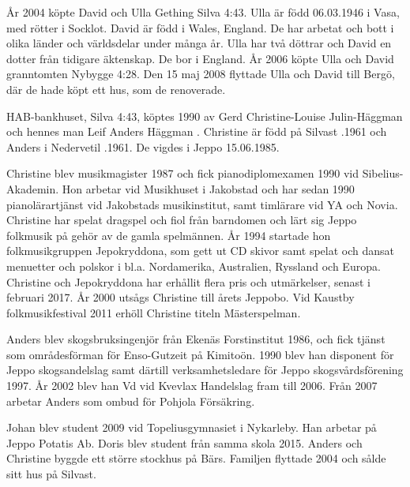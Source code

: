 År 2004 köpte David och Ulla Gething Silva 4:43. Ulla är född 06.03.1946 i Vasa, med rötter i Socklot. David är född i Wales, England. De har arbetat och bott i olika länder och världsdelar under många år. Ulla har två döttrar och David en dotter från tidigare äktenskap. De bor i England. År 2006 köpte Ulla och David granntomten Nybygge 4:28. Den 15 maj 2008 flyttade Ulla och David till Bergö, där de hade köpt ett hus, som de renoverade.


HAB-bankhuset, Silva 4:43, köptes 1990 av Gerd Christine-Louise Julin-Häggman och hennes man Leif Anders Häggman	. Christine är född på Silvast .1961 och Anders i Nedervetil .1961. De vigdes i Jeppo 15.06.1985.

Christine blev musikmagister 1987 och fick pianodiplomexamen 1990 vid Sibelius-Akademin. Hon arbetar vid Musikhuset i Jakobstad och har sedan 1990 pianolärartjänst vid Jakobstads musikinstitut, samt timlärare vid YA och Novia. Christine har spelat dragspel och fiol från barndomen och lärt sig Jeppo folkmusik på gehör av de gamla spelmännen. År 1994 startade hon folkmusikgruppen Jepokryddona, som gett ut CD skivor samt spelat och dansat menuetter och polskor i bl.a. Nordamerika, Australien, Ryssland och Europa. Christine och Jepokryddona har erhållit flera pris och utmärkelser, senast i februari 2017. År 2000 utsågs Christine till årets Jeppobo. Vid Kaustby folkmusikfestival 2011 erhöll Christine titeln Mästerspelman.

Anders blev skogsbruksingenjör från Ekenäs Forstinstitut 1986, och fick tjänst som områdesförman för Enso-Gutzeit på Kimitoön. 1990 blev han disponent för Jeppo skogsandelslag samt därtill verksamhetsledare för Jeppo skogsvårdsförening 1997. År 2002 blev han Vd vid Kvevlax Handelslag fram till 2006. Från 2007 arbetar Anders som ombud för Pohjola Försäkring.
\begin{jhchildren}
  \item {}
  \item {}
\end{jhchildren}
Johan blev student 2009 vid Topeliusgymnasiet i Nykarleby. Han arbetar på Jeppo Potatis Ab. Doris blev student från samma skola 2015.  Anders och Christine byggde ett större stockhus på Bärs. Familjen flyttade 2004 och sålde sitt hus på Silvast.


